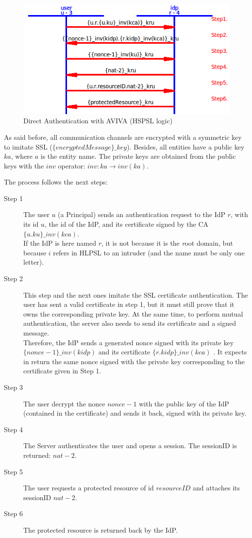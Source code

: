 \begin{figure}[!htbp]
	\centering
	\caption{Direct Authentication with AVIVA (HSPSL logic)}
	\label{fig:AVIVA_direct_auth}
	\includegraphics[width=1\textwidth]{images/prot_eva_2.png}
\end{figure}

As said before, all communication channels are encrypted with a symmetric key to imitate SSL ($\{encryptedMessage\}\_key$). Besides, all entities have a public key $ka$, where $a$ is the entity name. The private keys are obtained from the public keys with the $inv$ operator: $inv : ka \rightarrow inv(ka)$.

The process follows the next steps:
\begin{description}
	\item[Step 1] The user $ u $ (a Principal) sends an authentication request to the IdP $ r $, with its id $ u $, the id of the IdP, and its certificate signed by the CA $ \{u.ku\}\_inv(kca) $. 
	\\If the IdP is here named $ r $, it is not because it is the \textit{r}oot domain, but because $ i $ refers in HLPSL to an intruder (and the name must be only one letter).
	\item[Step 2] This step and the next ones imitate the SSL certificate authentication. The user has sent a valid certificate in step 1, but it must still prove that it owns the corresponding private key. At the same time, to perform mutual authentication, the server also needs to send its certificate and a signed message.
	 \\ Therefore, the IdP sends a generated nonce signed with its private key $ \{nonce-1\}\_inv(kidp) $ and its certificate $ \{r.kidp\}\_inv(kca) $ . It expects in return the same nonce signed with the private key corresponding to the certificate given in Step 1.
	\item[Step 3] The user decrypt the nonce $ nonce-1 $ with the public key of the IdP (contained in the certificate) and sends it back, signed with its private key.
	\item[Step 4] The Server authenticates the user and opens a session. The sessionID is returned: $ nat-2 $.
	\item[Step 5] The user requests a protected resource of id $ resourceID $ and attaches its sessionID $ nat-2 $.  
	\item[Step 6] The protected resource is returned back by the IdP.
\end{description}

